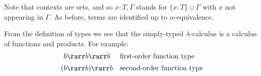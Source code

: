 \documentclass[12pt]{article}
\begin{document}
\begin{center}
\renewcommand{\arraystretch}{.5}
\label{t:SimTyp}
\end{center}%
%
Note that contexts are sets, and so $x : T,\Gamma$ stands for $\{x:T\}\cup\Gamma$ with $x$ not appearing in $\Gamma$. As before, terms are identified up to $\alpha$-equivalence.

From the definition of types we see that the simply-typed $\lambda$-calculus is a calculus of functions and products.
For example:
\[\begin{array}{c@{\quad}l}
 b \rarr b \rarr b & \mbox{first-order function type} \\[5pt]
(b \rarr b ) \rarr b & \mbox{second-order function type}
\end{array}\]

\end{document}
